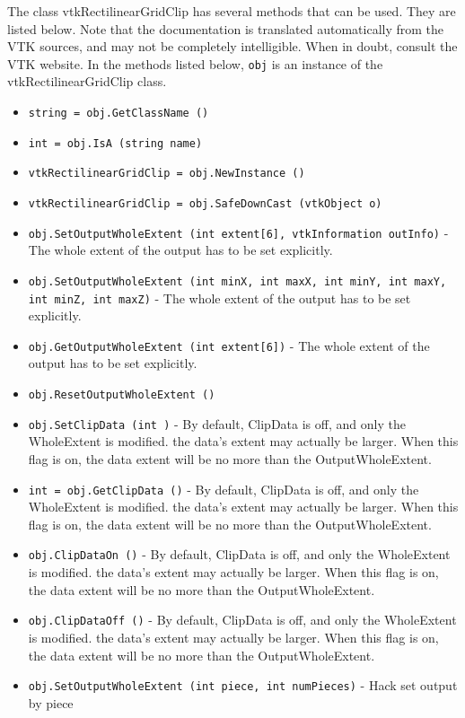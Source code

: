 The class vtkRectilinearGridClip has several methods that can be used.
  They are listed below.
Note that the documentation is translated automatically from the VTK sources,
and may not be completely intelligible.  When in doubt, consult the VTK website.
In the methods listed below, \verb|obj| is an instance of the vtkRectilinearGridClip class.
\begin{itemize}
\item  \verb|string = obj.GetClassName ()|

\item  \verb|int = obj.IsA (string name)|

\item  \verb|vtkRectilinearGridClip = obj.NewInstance ()|

\item  \verb|vtkRectilinearGridClip = obj.SafeDownCast (vtkObject o)|

\item  \verb|obj.SetOutputWholeExtent (int extent[6], vtkInformation outInfo)| -  The whole extent of the output has to be set explicitly.

\item  \verb|obj.SetOutputWholeExtent (int minX, int maxX, int minY, int maxY, int minZ, int maxZ)| -  The whole extent of the output has to be set explicitly.

\item  \verb|obj.GetOutputWholeExtent (int extent[6])| -  The whole extent of the output has to be set explicitly.

\item  \verb|obj.ResetOutputWholeExtent ()|

\item  \verb|obj.SetClipData (int )| -  By default, ClipData is off, and only the WholeExtent is modified.
 the data's extent may actually be larger.  When this flag is on,
 the data extent will be no more than the OutputWholeExtent.

\item  \verb|int = obj.GetClipData ()| -  By default, ClipData is off, and only the WholeExtent is modified.
 the data's extent may actually be larger.  When this flag is on,
 the data extent will be no more than the OutputWholeExtent.

\item  \verb|obj.ClipDataOn ()| -  By default, ClipData is off, and only the WholeExtent is modified.
 the data's extent may actually be larger.  When this flag is on,
 the data extent will be no more than the OutputWholeExtent.

\item  \verb|obj.ClipDataOff ()| -  By default, ClipData is off, and only the WholeExtent is modified.
 the data's extent may actually be larger.  When this flag is on,
 the data extent will be no more than the OutputWholeExtent.

\item  \verb|obj.SetOutputWholeExtent (int piece, int numPieces)| -  Hack set output by piece

\end{itemize}
